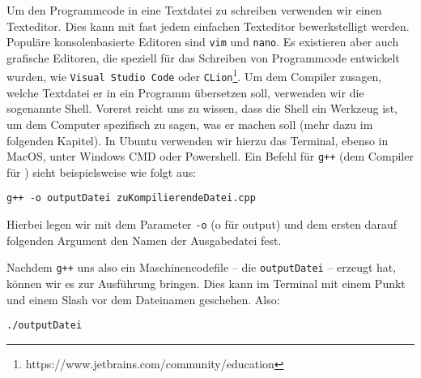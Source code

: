 Um den Programmcode in eine Textdatei zu schreiben verwenden wir einen Texteditor.
Dies kann mit fast jedem einfachen Texteditor bewerkstelligt werden. Populäre konsolenbasierte Editoren sind \texttt{vim} und \texttt{nano}. Es existieren aber auch grafische Editoren, die speziell für das Schreiben von Programmcode entwickelt wurden, wie \texttt{Visual Studio Code} oder \texttt{CLion}\footnote{https://www.jetbrains.com/community/education}.
Um dem Compiler zusagen, welche Textdatei er in ein Programm übersetzen soll, verwenden wir die sogenannte Shell. Vorerst reicht uns zu wissen, dass die Shell
ein Werkzeug ist, um dem Computer spezifisch zu sagen, was er machen soll (mehr dazu im folgenden Kapitel). In Ubuntu verwenden wir hierzu das Terminal, ebenso in MacOS,
unter Windows CMD oder Powershell. Ein Befehl für \texttt{g++} (dem Compiler für \Cpp) sieht beispielsweise wie folgt aus:

\begin{center}
	\texttt{g++ -o outputDatei zuKompilierendeDatei.cpp}
\end{center}
Hierbei legen wir mit dem Parameter \texttt{-o} (o für output) und dem ersten darauf folgenden Argument den Namen der Ausgabedatei fest.

Nachdem \texttt{g++} uns also ein Maschinencodefile -- die \texttt{outputDatei} --
erzeugt hat, können wir es zur Ausführung bringen. Dies kann im Terminal mit einem Punkt und einem Slash vor dem Dateinamen geschehen. Also:
\begin{center}
	\texttt{./outputDatei}
\end{center}



